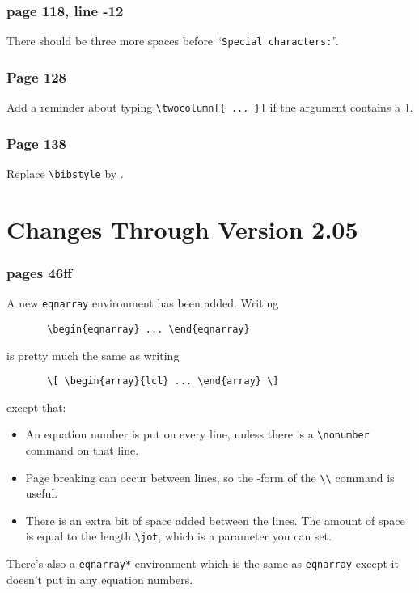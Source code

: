 \subsubsection*{page 118, line -12}
There should be three more spaces before ``{\tt Special characters:}''.

\subsubsection*{Page 128}
Add a reminder about typing \hbox{\verb|\twocolumn[{ ... }]|} if the
argument contains a {\tt ]}.

\subsubsection*{Page 138}
Replace \hbox{\verb|\bibstyle|} by \hbox{\verb||}.

\section*{Changes Through Version 2.05}

\subsubsection*{pages 46ff}
A new \mbox{\tt eqnarray} environment has been added.
Writing
\begin{verbatim}
       \begin{eqnarray} ... \end{eqnarray}
\end{verbatim}
is pretty much the same as writing
\begin{verbatim}
       \[ \begin{array}{lcl} ... \end{array} \]
\end{verbatim}
except that:
\begin{itemize}
   \item An equation number is put on every line, unless there
         is a \hbox{\verb"\nonumber"} command on that line.
         
   \item Page breaking can occur between lines, so the {\tt *}-form
         of the \verb"\\" command is useful.
   \item There is an extra bit of space added between the lines.
         The amount of space is equal to the length \verb"\jot",
         which is a parameter you can set.
\end{itemize}
There's also a \hbox{\tt eqnarray*} environment which is the
same as \hbox{\tt eqnarray} except it doesn't put in any equation
numbers.  

